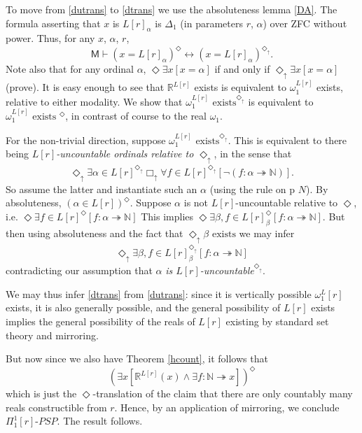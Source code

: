 \documentclass{article}
\theoremstyle{definition}
\newcommand{\du}{\Diamond_\uparrow}
\newcommand{\bu}{\Box_\uparrow}
\begin{document}
To move from \eqref{dutrans} to \eqref{dtrans} we use the absoluteness 
lemma \ref{DA}. The formula asserting that $x$ is $L[r]_\alpha$ is $\Delta_1$ 
(in parameters $r$, $\alpha$) 
over ZFC without power. Thus, for any $x$, $\alpha$, $r$, 
\begin{equation}\label{butt}\mathsf{M} \vdash (x = L[r]_\alpha)^\Diamond \leftrightarrow
(x = L[r]_\alpha)^{\du}.\end{equation}
Note also that for any ordinal $\alpha$, $\Diamond \exists x[ x = \alpha]$ if and only if 
$\du \exists x[x = \alpha]$ (prove).
It is easy enough to see that $\mathbb{R}^{L[r]}$ exists is equivalent to $\omega_1^{L[r]}$
exists, relative to either modality. 
We show that $\omega_1^{L[r]} \text{ exists}^{\du}$ is equivalent to 
$\omega_1^{L[r]} \text{ exists }^\Diamond$, 
in contrast of course to the real $\omega_1$.

For the non-trivial direction, suppose $\omega_1^{L[r]} \text{ exists}^{\du}$. 
This is equivalent to there being \emph{$L[r]$-uncountable ordinals relative to $\du$}, in the sense that
\[\du \exists \alpha \in L[r]^{\du} \bu \forall f \in L[r]^{\du}[\neg(f : \alpha \twoheadrightarrow \mathbb{N})].\]
So assume the latter and instantiate such an $\alpha$ (using the rule on p $N$). 
By absoluteness, $(\alpha \in L[r])^\Diamond$. Suppose $\alpha$ is not
$L[r]$-uncountable relative to $\Diamond$, i.e. 
$\Diamond \exists f \in L[r]^\Diamond[f : \alpha \twoheadrightarrow \mathbb{N}]$
This implies 
$\Diamond \exists \beta, f \in L[r]_\beta^\Diamond[f : \alpha \twoheadrightarrow \mathbb{N}]$. 
But then using absoluteness and the fact that $\du \beta \text{ exists}$ we may infer
\[\du \exists \beta, f \in L[r]_\beta^{\du}[f : \alpha \twoheadrightarrow \mathbb{N}]\]
contradicting our assumption that $\alpha$ \emph{is $L[r]$-uncountable}$^{\du}$.

We may thus infer \eqref{dtrans} from \eqref{dutrans}: since it is vertically possible 
$\omega_1^L[r]$ exists, it is also generally possible, and the general possibility of 
$L[r]$ exists implies the general possibility of the reals of $L[r]$ existing 
by standard set theory and mirroring. 

But now since we also have Theorem \ref{hcount}, it follows that 
\begin{equation}
    (\exists x[\mathbb{R}^{L[r]}(x) \wedge \exists f : \mathbb{N} \twoheadrightarrow x])^\Diamond
\end{equation}
which is just the $\Diamond$-translation of the claim that there are only countably many 
reals constructible from $r$. Hence, by an application of mirroring, we conclude $\Pi_1^1[r]$-$PSP$.
The result follows.
\end{document}
